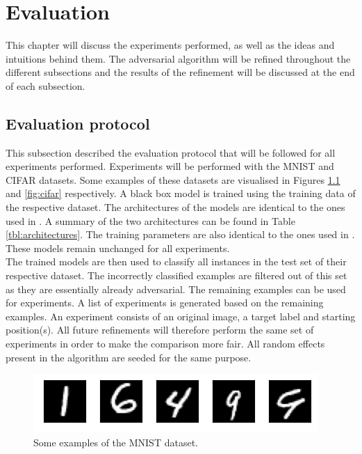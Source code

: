 \chapter{Evaluation}
This chapter will discuss the experiments performed, as well as the ideas and intuitions behind them. The adversarial algorithm will be refined throughout the different subsections and the results of the refinement will be discussed at the end of each subsection.

\section{Evaluation protocol}
This subsection described the evaluation protocol that will be followed for all experiments performed. Experiments will be performed with the MNIST \cite{mnist} and CIFAR \cite{cifar} datasets. Some examples of these datasets are visualised in Figures \ref{fig:mnist} and \ref{fig:cifar} respectively. A black box model is trained using the training data of the respective dataset. The architectures of the models are identical to the ones used in \cite{cw_attack, defensive_distillation}. A summary of the two architectures can be found in Table \ref{tbl:architectures}. The training parameters are also identical to the ones used in \cite{cw_attack, defensive_distillation}. These models remain unchanged for all experiments.\\

The trained models are then used to classify all instances in the test set of their respective dataset. The incorrectly classified examples are filtered out of this set as they are essentially already adversarial. The remaining examples can be used for experiments. A list of experiments is generated based on the remaining examples. An experiment consists of an original image, a target label and starting position(s). All future refinements will therefore perform the same set of experiments in order to make the comparison more fair. All random effects present in the algorithm are seeded for the same purpose.\\

\begin{figure}
\centering
\includegraphics[width=\textwidth]{Images/mnist.png}
\caption[Some examples of the MNIST dataset]{Some examples of the MNIST \cite{mnist} dataset.}
\label{fig:mnist}
\end{figure}

